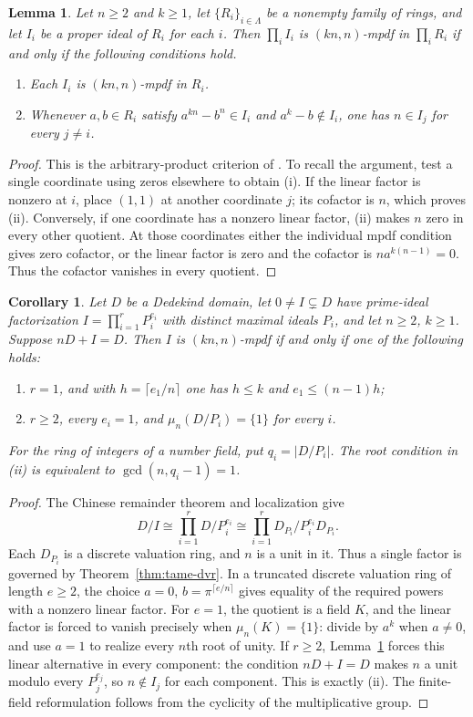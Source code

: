 \documentclass[11pt,a4paper]{amsart}
\newtheorem{lemma}[theorem]{Lemma}
\newtheorem{corollary}[theorem]{Corollary}
\theoremstyle{definition}
\theoremstyle{remark}
\numberwithin{equation}{section}
\begin{document}
\begin{lemma}\label{lem:product}
Let $n\ge2$ and $k\ge1$, let $\{R_i\}_{i\in\Lambda}$ be a nonempty family of rings, and let
$I_i$ be a proper ideal of $R_i$ for each $i$. Then $\prod_iI_i$ is $(kn,n)$-mpdf in
$\prod_iR_i$ if and only if the following conditions hold.
\begin{enumerate}
\item Each $I_i$ is $(kn,n)$-mpdf in $R_i$.
\item Whenever $a,b\in R_i$ satisfy $a^{kn}-b^n\in I_i$ and $a^k-b\notin I_i$, one has
$n\in I_j$ for every $j\ne i$.
\end{enumerate}
\end{lemma}
\begin{proof}
This is the arbitrary-product criterion of \cite{TS}. To recall the
argument, test a single coordinate using zeros elsewhere to obtain
(i). If the linear factor is nonzero at $i$, place $(1,1)$ at another
coordinate $j$; its cofactor is $n$, which proves (ii). Conversely,
if one coordinate has a nonzero linear factor, (ii) makes $n$ zero
in every other quotient. At those coordinates either the individual
mpdf condition gives zero cofactor, or the linear factor is zero and
the cofactor is $na^{k(n-1)}=0$. Thus the cofactor vanishes in every
quotient.
\end{proof}

\begin{corollary} \label{cor:dedekind-tame}
Let $D$ be a Dedekind domain, let $0\ne I\subsetneq D$ have prime-ideal
factorization $I=\prod_{i=1}^r P_i^{e_i}$ with distinct maximal ideals
$P_i$, and let $n\ge2$, $k\ge1$. Suppose $nD+I=D$.
Then $I$ is $(kn,n)$-mpdf if and only if one of the following holds:
\begin{enumerate}
\item $r=1$, and with $h=\lceil e_1/n\rceil$ one has
      $h\le k$ and $e_1\le(n-1)h$;
\item $r\ge2$, every $e_i=1$, and $\mu_n(D/P_i)=\{1\}$ for every $i$.
\end{enumerate}
For the ring of integers of a number field, put $q_i=|D/P_i|$.
The root condition in (ii) is equivalent to $\gcd(n,q_i-1)=1$.
\end{corollary}
\begin{proof}
The Chinese remainder theorem and localization give
\[
 D/I\cong\prod_{i=1}^r D/P_i^{e_i}
       \cong\prod_{i=1}^r D_{P_i}/P_i^{e_i}D_{P_i}.
\]
Each $D_{P_i}$ is a discrete valuation ring, and $n$ is a unit in it.
Thus a single factor is governed by Theorem~\ref{thm:tame-dvr}.
In a truncated discrete valuation ring of length $e\ge2$, the choice
$a=0$, $b=\pi^{\lceil e/n\rceil}$ gives equality of the required powers
with a nonzero linear factor. For $e=1$, the quotient is a field $K$,
and the linear factor is forced to vanish precisely when
$\mu_n(K)=\{1\}$: divide by $a^k$ when $a\ne0$, and use $a=1$ to
realize every $n$th root of unity.
If $r\ge2$, Lemma~\ref{lem:product} forces this linear alternative in
every component: the condition $nD+I=D$ makes $n$ a unit modulo every $P_j^{e_j}$,
so $n\notin I_j$ for each component.
This is exactly (ii). The finite-field reformulation follows from the
cyclicity of the multiplicative group.
\end{proof}
\end{document}
